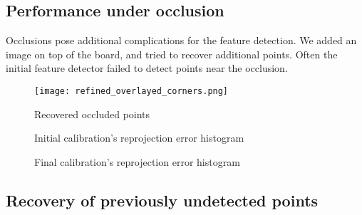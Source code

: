 \subsection{Performance under occlusion}\label{sub:performance_under_occlusion}

Occlusions pose additional complications for the feature detection. We added an
image on top of the board, and tried to recover additional points. Often the
initial feature detector failed to detect points near the occlusion.

\begin{figure}
  \texttt{[image: refined\_overlayed\_corners.png]}
  \caption{Recovered occluded points}
\end{figure}

\begin{figure}[h]
	\caption{Initial calibration's reprojection error histogram}
\end{figure}
\begin{figure}[h]
	\caption{Final calibration's reprojection error histogram}
\end{figure}

\subsection{Recovery of previously undetected points}\label{sub:recovery_of_previously_undetected_points}




